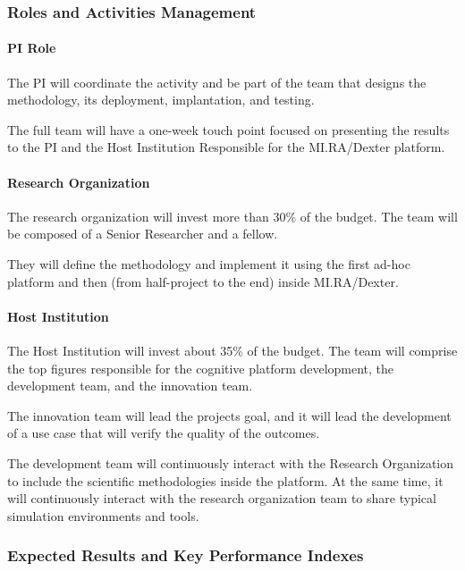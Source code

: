\subsubsection{\texorpdfstring{Roles and Activities Management
}{Roles and Activities Management }}\label{roles-and-activities-management}

\paragraph{PI Role}\label{pi-role}

The PI will coordinate the activity and be part of the team that designs
the methodology, its deployment, implantation, and testing.

The full team will have a one-week touch point focused on presenting the
results to the PI and the Host Institution Responsible for the
MI.RA/Dexter platform.

\paragraph{Research Organization}\label{research-organization}

The research organization will invest more than 30\% of the budget. The
team will be composed of a Senior Researcher and a fellow.

They will define the methodology and implement it using the first ad-hoc
platform and then (from half-project to the end) inside MI.RA/Dexter.

\paragraph{Host Institution}\label{host-institution}

The Host Institution will invest about 35\% of the budget. The team will
comprise the top figures responsible for the cognitive platform
development, the development team, and the innovation team.

The innovation team will lead the project\textquotesingle s goal, and it
will lead the development of a use case that will verify the quality of
the outcomes.

The development team will continuously interact with the Research
Organization to include the scientific methodologies inside the
platform. At the same time, it will continuously interact with the
research organization team to share typical simulation environments and
tools.

\subsubsection{\texorpdfstring{Expected Results and Key Performance
Indexes
}{Expected Results and Key Performance Indexes }}\label{expected-results-and-key-performance-indexes}


